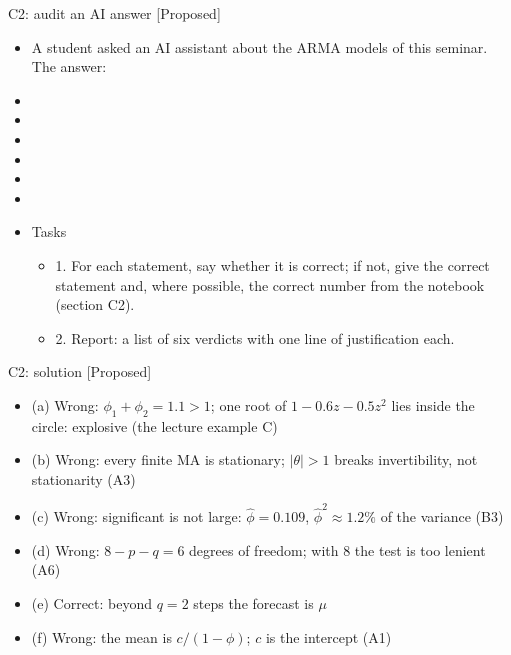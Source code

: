 \begin{frame}{C2: audit an AI answer [Proposed]}
\itemsize{\scriptsize}
\begin{itemize}
    \item A student asked an AI assistant about the ARMA models of this seminar. The answer:
    \item {}
    \item {}
    \item {}
    \item {}
    \item {}
    \item {}
    \item Tasks
    \begin{itemize}
        \item 1. For each statement, say whether it is correct; if not, give the correct statement and, where possible, the correct number from the notebook (section C2).
        \item 2. Report: a list of six verdicts with one line of justification each.
    \end{itemize}
\end{itemize}
\end{frame}

\ifsolutions
\begin{frame}{C2: solution [Proposed]}
\itemsize{\scriptsize}
\begin{itemize}
    \item (a) Wrong: $\phi_1 + \phi_2 = 1.1 > 1$; one root of $1 - 0.6z - 0.5z^2$ lies inside the circle: explosive (the lecture example C)
    \item (b) Wrong: every finite MA is stationary; $|\theta| > 1$ breaks invertibility, not stationarity (A3)
    \item (c) Wrong: significant is not large: $\hat\phi = 0.109$, $\hat\phi^2 \approx 1.2\%$ of the variance (B3)
    \item (d) Wrong: $8 - p - q = 6$ degrees of freedom; with 8 the test is too lenient (A6)
    \item (e) Correct: beyond $q = 2$ steps the forecast is $\mu$
    \item (f) Wrong: the mean is $c/(1 - \phi)$; $c$ is the intercept (A1)
\end{itemize}
\end{frame}
\fi


